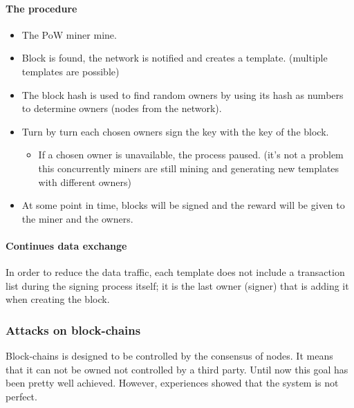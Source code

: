 \paragraph{The procedure}
\begin{itemize}
\item The PoW miner mine.
\item Block is found, the network is notified and creates a template. (multiple templates are possible)
\item The block hash is used to find random owners by using its hash as numbers to determine owners (nodes from the network).
\item Turn by turn each chosen owners sign the key with the key of the block.
\begin{itemize}
\item If a chosen owner is unavailable, the process paused. (it's not a problem this concurrently miners are still mining and generating new templates with different owners)
\end{itemize}
\item At some point in time, blocks will be signed and the reward will be given to the miner and the owners.
\end{itemize}

\paragraph{Continues data exchange}
In order to reduce the data traffic, each template does not include a transaction list during the signing process itself; it is the last owner (signer) that is adding it when creating the block.

\subsubsection{Attacks on block-chains}
Block-chains is designed to be controlled by the consensus of nodes. It means that it can not be owned not controlled by a third party. Until now this goal has been pretty well achieved. However, experiences showed that the system is not perfect.

